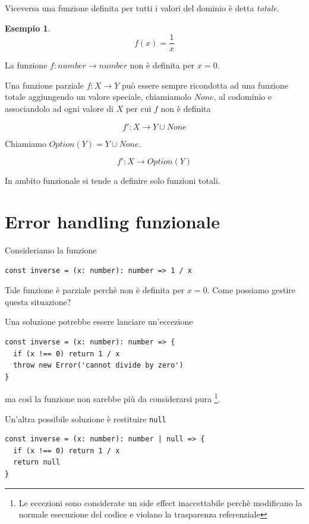 \documentclass[12pt]{article}
\newtheorem{example}{Esempio}
\begin{document}
Viceversa una funzione definita per tutti i valori del dominio è detta \emph{totale}.

\begin{example}
$$
f(x) = \frac{1}{x}
$$
\end{example}

La funzione $f: number \rightarrow number$ non è definita per $x = 0$.

Una funzione parziale $f: X \rightarrow Y$ può essere sempre ricondotta ad una funzione totale aggiungendo un valore speciale,
chiamiamolo $None$, al codominio e associandolo ad ogni valore di $X$ per cui $f$ non è definita

$$
f': X \rightarrow Y \cup None
$$

Chiamiamo $Option(Y) = Y \cup None$.

$$
f': X \rightarrow Option(Y)
$$

In ambito funzionale si tende a definire solo funzioni totali.

\newpage

\section{Error handling funzionale}

Consideriamo la funzione

\begin{verbatim}
const inverse = (x: number): number => 1 / x
\end{verbatim}

Tale funzione è parziale perchè non è definita per $x = 0$. Come possiamo gestire questa situazione?

Una soluzione potrebbe essere lanciare un'eccezione

\begin{verbatim}
const inverse = (x: number): number => {
  if (x !== 0) return 1 / x
  throw new Error('cannot divide by zero')
}
\end{verbatim}

ma così la funzione non sarebbe più da considerarsi pura
\footnote{Le eccezioni sono considerate un side effect inaccettabile perchè modificano la normale esecuzione del codice
e violano la trasparenza referenziale}.

Un'altra possibile soluzione è restituire \texttt{null}

\begin{verbatim}
const inverse = (x: number): number | null => {
  if (x !== 0) return 1 / x
  return null
}
\end{verbatim}
\end{document}
